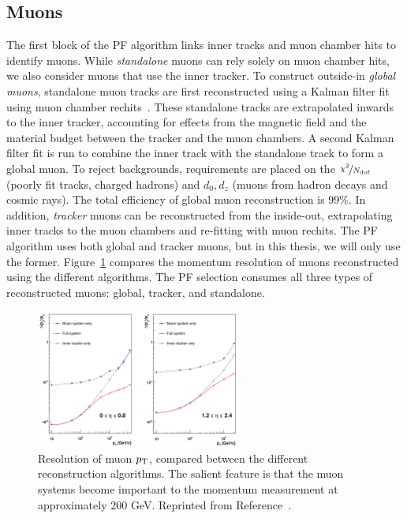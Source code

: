 \subsection{Muons}
\label{sec:cms:muons}

The first block of the PF algorithm links inner tracks and muon chamber hits to identify muons.
While \emph{standalone} muons can rely solely on muon chamber hits, we also consider muons that use the inner tracker.
To construct outside-in \emph{global muons}, standalone muon tracks are first reconstructed using a Kalman filter fit using muon chamber rechits~\cite{cmstdr1,cmsmuon}.
These standalone tracks are extrapolated inwards to the inner tracker, accounting for effects from the magnetic field and the  material budget between the tracker and the muon chambers.
A second Kalman filter fit is run to combine the inner track with the standalone track to form a global muon.
To reject backgrounds, requirements are placed on the $\nicefrac{\chi^2}{N_\mathrm{dof}}$ (poorly fit tracks, charged hadrons) and $d_0,d_z$ (muons from hadron decays and cosmic rays).
The total efficiency of global muon reconstruction is 99\%.
In addition, \emph{tracker} muons can be reconstructed from the inside-out, extrapolating inner tracks to the muon chambers and re-fitting with muon rechits.
The PF algorithm uses both global and tracker muons, but in this thesis, we will only use the former.
Figure~\ref{fig:cms:muonpt} compares the momentum resolution of muons reconstructed using the different algorithms.  
The PF selection consumes all three types of reconstructed muons: global, tracker, and standalone.

\begin{figure}[]
\begin{center}
    \includegraphics[width=0.6\textwidth]{figures/cms/muonpt.png}
    \caption{Resolution of muon $p_\mathrm{T}$, compared between the different reconstruction algorithms. 
             The salient feature is that the muon systems become important to the momentum measurement at approximately 200 GeV.
             Reprinted from Reference~\cite{cmsmuon}.}
    \label{fig:cms:muonpt}
\end{center}
\end{figure}

